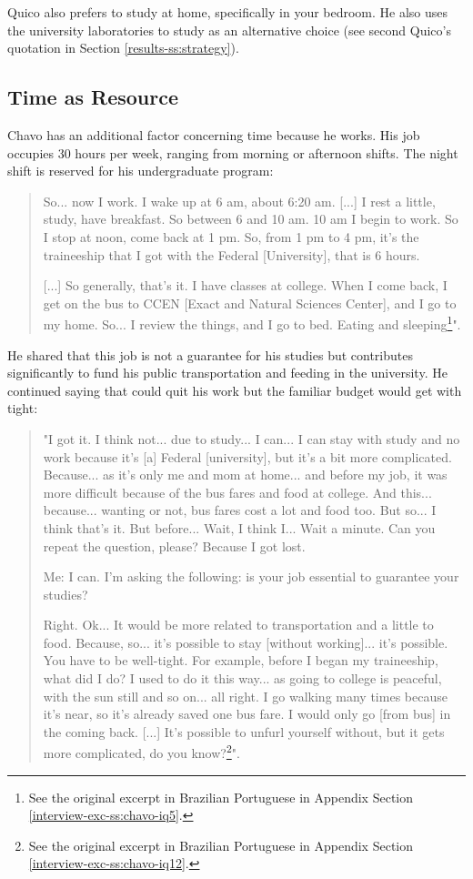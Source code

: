 Quico also prefers to study at home, specifically in your bedroom. He also uses the university laboratories to study as an alternative choice (see second Quico's quotation in Section \ref{results-ss:strategy}).

\subsection{Time as Resource}
\label{results-ss:time}

Chavo has an additional factor concerning time because he works. His job occupies 30 hours per week, ranging from morning or afternoon shifts. The night shift is reserved for his undergraduate program:
\begin{quote}
    So... now I work. I wake up at 6 am, about 6:20 am. [...] I rest a little, study, have breakfast. So between 6 and 10 am. 10 am I begin to work. So I stop at noon, come back at 1 pm. So, from 1 pm to 4 pm, it's the traineeship that I got with the Federal [University], that is 6 hours.

    [...] So generally, that's it. I have classes at college. When I come back, I get on the bus to CCEN [Exact and Natural Sciences Center], and I go to my home. So... I review the things, and I go to bed. Eating and sleeping\footnote{See the original excerpt in Brazilian Portuguese in Appendix Section \ref{interview-exc-ss:chavo-iq5}.}".    
\end{quote}
He shared that this job is not a guarantee for his studies but contributes significantly to fund his public transportation and feeding in the university. He continued saying that could quit his work but the familiar budget would get with tight:
\begin{quote}
    "I got it. I think not... due to study... I can... I can stay with study and no work because it's [a] Federal [university], but it's a bit more complicated. Because... as it's only me and mom at home... and before my job, it was more difficult because of the bus fares and food at college. And this... because... wanting or not, bus fares cost a lot and food too. But so... I think that's it. But before... Wait, I think I... Wait a minute. Can you repeat the question, please? Because I got lost.

    \colorbox{black!15}{Me: I can. I'm asking the following: is your job essential to guarantee your studies?}

    Right. Ok... It would be more related to transportation and a little to food. Because, so... it's possible to stay [without working]... it's possible. You have to be well-tight. For example, before I began my traineeship, what did I do? I used to do it this way... as going to college is peaceful, with the sun still and so on... all right. I go walking many times because it's near, so it's already saved one bus fare. I would only go [from bus] in the coming back. [...] It's possible to unfurl yourself without, but it gets more complicated, do you know?\footnote{See the original excerpt in Brazilian Portuguese in Appendix Section \ref{interview-exc-ss:chavo-iq12}.}".
\end{quote}

